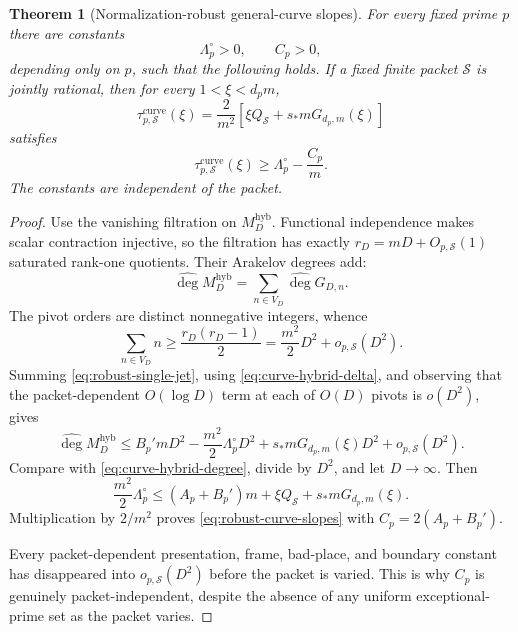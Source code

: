 \documentclass[11pt]{article}
\newtheorem{theorem}{Theorem}[section]
\theoremstyle{definition}
\theoremstyle{remark}
\newcommand{\widehatdeg}{\widehat{\deg}}
\begin{document}
\begin{theorem}[Normalization-robust general-curve slopes]
\label{thm:curve-holonomy}
For every fixed prime $p$ there are constants
\[
 \Lambda_p^\circ>0,\qquad C_p>0,
\]
depending only on $p$, such that the following holds.  If a fixed finite packet
$\mathcal S$ is jointly rational, then for every $1<\xi<d_pm$,
\begin{equation}\label{eq:curve-tau}
 \tau^{\mathrm{curve}}_{p,\mathcal S}(\xi)
 =\frac{2}{m^2}\left[
   \xi Q_{\mathcal S}+s_*mG_{d_p,m}(\xi)\right]
\end{equation}
satisfies
\begin{equation}\label{eq:robust-curve-slopes}
 \boxed{
 \tau^{\mathrm{curve}}_{p,\mathcal S}(\xi)
 \ge\Lambda_p^\circ-\frac{C_p}{m}.}
\end{equation}
The constants are independent of the packet.
\end{theorem}

\begin{proof}
Use the vanishing filtration on $M_D^{\mathrm{hyb}}$.  Functional independence
makes scalar contraction injective, so the filtration has exactly
$r_D=mD+O_{p,\mathcal S}(1)$ saturated rank-one quotients.  Their Arakelov
degrees add:
\[
 \widehatdeg M_D^{\mathrm{hyb}}
 =\sum_{n\in V_D}\widehatdeg G_{D,n}.
\]
The pivot orders are distinct nonnegative integers, whence
\begin{equation}\label{eq:robust-pivot-sum}
 \sum_{n\in V_D}n
 \ge\frac{r_D(r_D-1)}2
 =\frac{m^2}{2}D^2+o_{p,\mathcal S}(D^2).
\end{equation}
Summing \eqref{eq:robust-single-jet}, using
\eqref{eq:curve-hybrid-delta}, and observing that the packet-dependent
$O(\log D)$ term at each of $O(D)$ pivots is $o(D^2)$, gives
\[
 \widehatdeg M_D^{\mathrm{hyb}}
 \le B_p'mD^2-\frac{m^2}{2}\Lambda_p^\circ D^2
 +s_*mG_{d_p,m}(\xi)D^2+o_{p,\mathcal S}(D^2).
\]
Compare with \eqref{eq:curve-hybrid-degree}, divide by $D^2$, and let
$D\to\infty$.  Then
\[
 \frac{m^2}{2}\Lambda_p^\circ
 \le(A_p+B_p')m+\xi Q_{\mathcal S}
       +s_*mG_{d_p,m}(\xi).
\]
Multiplication by $2/m^2$ proves
\eqref{eq:robust-curve-slopes} with $C_p=2(A_p+B_p')$.

Every packet-dependent presentation, frame, bad-place, and boundary constant
has disappeared into $o_{p,\mathcal S}(D^2)$ before the packet is varied.
This is why $C_p$ is genuinely packet-independent, despite the absence of any
uniform exceptional-prime set as the packet varies.
\end{proof}
\end{document}
